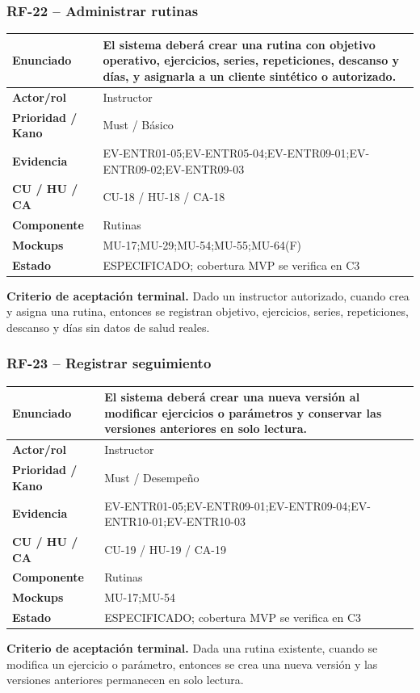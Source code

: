 \documentclass[11pt,a4paper,twoside]{article}
\begin{document}
\subsubsection{RF-22 -- Administrar rutinas}
\begin{tabularx}{\textwidth}{|>{\bfseries}p{3.2cm}|X|}\hline
Enunciado & El sistema deberá crear una rutina con objetivo operativo, ejercicios, series, repeticiones, descanso y días, y asignarla a un cliente sintético o autorizado. \\ \hline
Actor/rol & Instructor \\ \hline
Prioridad / Kano & Must / Básico \\ \hline
Evidencia & EV-ENTR01-05;EV-ENTR05-04;EV-ENTR09-01;EV-ENTR09-02;EV-ENTR09-03 \\ \hline
CU / HU / CA & CU-18 / HU-18 / CA-18 \\ \hline
Componente & Rutinas \\ \hline
Mockups & MU-17;MU-29;MU-54;MU-55;MU-64(F) \\ \hline
Estado & ESPECIFICADO; cobertura MVP se verifica en C3 \\ \hline
\end{tabularx}
\textbf{Criterio de aceptación terminal.} Dado un instructor autorizado, cuando crea y asigna una rutina, entonces se registran objetivo, ejercicios, series, repeticiones, descanso y días sin datos de salud reales.
\subsubsection{RF-23 -- Registrar seguimiento}
\begin{tabularx}{\textwidth}{|>{\bfseries}p{3.2cm}|X|}\hline
Enunciado & El sistema deberá crear una nueva versión al modificar ejercicios o parámetros y conservar las versiones anteriores en solo lectura. \\ \hline
Actor/rol & Instructor \\ \hline
Prioridad / Kano & Must / Desempeño \\ \hline
Evidencia & EV-ENTR01-05;EV-ENTR09-01;EV-ENTR09-04;EV-ENTR10-01;EV-ENTR10-03 \\ \hline
CU / HU / CA & CU-19 / HU-19 / CA-19 \\ \hline
Componente & Rutinas \\ \hline
Mockups & MU-17;MU-54 \\ \hline
Estado & ESPECIFICADO; cobertura MVP se verifica en C3 \\ \hline
\end{tabularx}
\textbf{Criterio de aceptación terminal.} Dada una rutina existente, cuando se modifica un ejercicio o parámetro, entonces se crea una nueva versión y las versiones anteriores permanecen en solo lectura.
\end{document}

